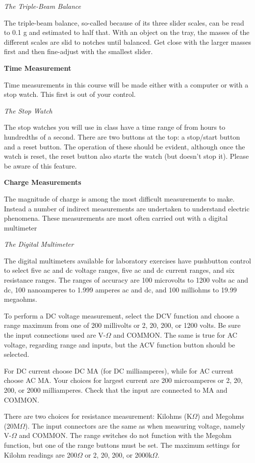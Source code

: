 \textit{The Triple-Beam Balance}

The triple-beam balance, so-called because of its three slider scales, can be read to 0.1 g and estimated to half that. With an object on the tray, the masses of the different scales are slid to notches until balanced. Get close with the larger masses first and then fine-adjust with the smallest slider.

\textbf{Time Measurement}

Time measurements in this course will be made either with a computer or with a stop watch. This first is out of your control.

\textit{The Stop Watch}

The stop watches you will use in class have a time range of from hours to hundredths of a second. There are two buttons at the top: a stop/start button and a reset button. The operation of these should be evident, although once the watch is reset, the reset button also starts the watch (but doesn't stop it). Please be aware of this feature.

\textbf{Charge Measurements}

The magnitude of charge is among the most difficult measurements to make. Instead a number of indirect measurements are undertaken to understand electric phenomena. These measurements are most often carried out with a digital multimeter

\textit{The Digital Multimeter}

The digital multimeters available for laboratory exercises have pushbutton control to select five ac and dc voltage ranges, five ac and dc current ranges, and six resistance ranges. The ranges of accuracy are 100 microvolts to 1200 volts ac and dc, 100 nanoamperes to 1.999 amperes ac and dc, and 100 milliohms to 19.99 megaohms.

To perform a DC voltage measurement, select the DCV function and choose a range maximum from one of 200 millivolts or 2, 20, 200, or 1200 volts. Be sure the input connections used are V-$\Omega$ and COMMON. The same is true for AC voltage, regarding range and inputs, but the ACV function button should be selected.

For DC current choose DC MA (for DC milliamperes), while for AC current choose AC MA. Your choices for largest current are 200 microamperes or 2, 20, 200, or 2000 milliamperes. Check that the input are connected to MA and COMMON.

There are two choices for resistance measurement: Kilohms (K$\Omega$) and Megohms (20M$\Omega$). The input connectors are the same as when measuring voltage, namely V-$\Omega$ and COMMON. The range switches do not function with the Megohm function, but one of the range buttons must be set. The maximum settings for Kilohm readings are 200$\Omega$ or 2, 20, 200, or 2000k$\Omega$.

